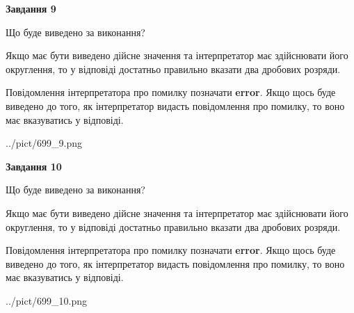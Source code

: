 \documentclass[12pt, ukrainian]{article}
\begin{document}
{\begin {Large}
{\begin {center}\textbf{Завдання 9}\end {center}}\par
Що буде виведено за виконання? \par

Якщо має бути виведено дійсне значення та інтерпретатор має здійснювати його округлення, 
то у відповіді достатньо правильно вказати два дробових розряди.

Повідомлення інтерпретатора про помилку позначати \textbf{error}.
Якщо щось буде виведено до того, як інтерпретатор видасть повідомлення про помилку, 
то воно має вказуватись у відповіді. \par

\begin{center}
	{../pict/699_9.png}
\end{center}
\newpage

{\begin {center}\textbf{Завдання 10}\end {center}}\par
Що буде виведено за виконання? \par

Якщо має бути виведено дійсне значення та інтерпретатор має здійснювати його округлення, 
то у відповіді достатньо правильно вказати два дробових розряди.

Повідомлення інтерпретатора про помилку позначати \textbf{error}.
Якщо щось буде виведено до того, як інтерпретатор видасть повідомлення про помилку, 
то воно має вказуватись у відповіді. \par

\begin{center}
	{../pict/699_10.png}
\end{center}
\newpage

\end {Large}}
\end{document}
